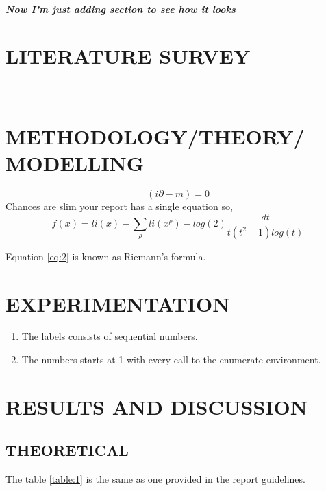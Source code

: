 \documentclass[12pt,a4paper]{report}
\begin{document}
\paragraph{Now I'm just adding section to see how it looks}

\lipsum[1]


\chapter{LITERATURE SURVEY}

\lipsum[3-8] \\

\lipsum
\chapter{\MakeUppercase{Methodology/Theory/ Modelling}}
\lipsum[1]
\[(i \partial -m) = 0 \]
Chances are slim your report has a single equation so,
\begin{equation}  \label{eq:2}
 f(x) = li(x)-\sum_{\rho}li(x^{\rho}) -  log(2) \frac{dt}{t(t^{2}-1)log(t)}
\end{equation}

Equation \ref{eq:2} is known as Riemann's formula.\lipsum[4]
\chapter{\MakeUppercase{Experimentation}}
\lipsum[1]
\break


\begin{enumerate}
  \item The labels consists of sequential numbers.
  \item The numbers starts at 1 with every call to the enumerate environment.
\end{enumerate}


\chapter{\MakeUppercase{{Results and Discussion}}}
\lipsum[1]
\section{THEORETICAL}
\lipsum[1]The table \ref{table:1} is the same as one provided in the report guidelines. \\
 
\end{document}
